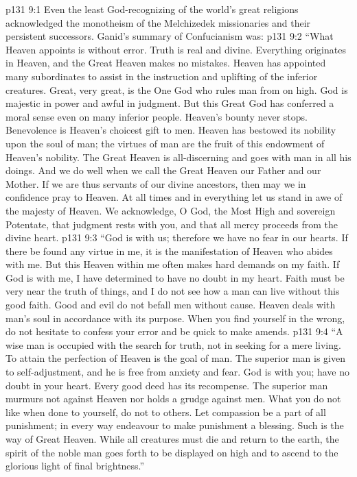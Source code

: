 \vs p131 9:1 Even the least God\hyp{}recognizing of the world’s great religions acknowledged the monotheism of the Melchizedek missionaries and their persistent successors. Ganid’s summary of Confucianism was:
\vs p131 9:2 \pc “What Heaven appoints is without error. Truth is real and divine. Everything originates in Heaven, and the Great Heaven makes no mistakes. Heaven has appointed many subordinates to assist in the instruction and uplifting of the inferior creatures. Great, very great, is the One God who rules man from on high. God is majestic in power and awful in judgment. But this Great God has conferred a moral sense even on many inferior people. Heaven’s bounty never stops. Benevolence is Heaven’s choicest gift to men. Heaven has bestowed its nobility upon the soul of man; the virtues of man are the fruit of this endowment of Heaven’s nobility. The Great Heaven is all\hyp{}discerning and goes with man in all his doings. And we do well when we call the Great Heaven our Father and our Mother. If we are thus servants of our divine ancestors, then may we in confidence pray to Heaven. At all times and in everything let us stand in awe of the majesty of Heaven. We acknowledge, O God, the Most High and sovereign Potentate, that judgment rests with you, and that all mercy proceeds from the divine heart.
\vs p131 9:3 “God is with us; therefore we have no fear in our hearts. If there be found any virtue in me, it is the manifestation of Heaven who abides with me. But this Heaven within me often makes hard demands on my faith. If God is with me, I have determined to have no doubt in my heart. Faith must be very near the truth of things, and I do not see how a man can live without this good faith. Good and evil do not befall men without cause. Heaven deals with man’s soul in accordance with its purpose. When you find yourself in the wrong, do not hesitate to confess your error and be quick to make amends.
\vs p131 9:4 “A wise man is occupied with the search for truth, not in seeking for a mere living. To attain the perfection of Heaven is the goal of man. The superior man is given to self\hyp{}adjustment, and he is free from anxiety and fear. God is with you; have no doubt in your heart. Every good deed has its recompense. The superior man murmurs not against Heaven nor holds a grudge against men. What you do not like when done to yourself, do not to others. Let compassion be a part of all punishment; in every way endeavour to make punishment a blessing. Such is the way of Great Heaven. While all creatures must die and return to the earth, the spirit of the noble man goes forth to be displayed on high and to ascend to the glorious light of final brightness.”
